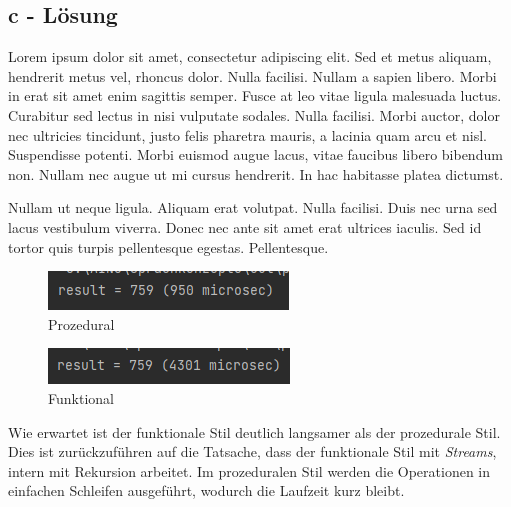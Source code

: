 \subsection*{c - Lösung}
\newline
\begin{code}[language=text, caption={input.txt}, label={lst:Aufgabe4c}]
Lorem ipsum dolor sit amet, consectetur adipiscing elit.
Sed et metus aliquam, hendrerit metus vel, rhoncus dolor.
Nulla facilisi. Nullam a sapien libero.
Morbi in erat sit amet enim sagittis semper.
Fusce at leo vitae ligula malesuada luctus.
Curabitur sed lectus in nisi vulputate sodales. Nulla facilisi.
Morbi auctor, dolor nec ultricies tincidunt, justo felis pharetra mauris, a lacinia quam arcu et nisl.
Suspendisse potenti. Morbi euismod augue lacus, vitae faucibus libero bibendum non.
Nullam nec augue ut mi cursus hendrerit. In hac habitasse platea dictumst.

Nullam ut neque ligula. Aliquam erat volutpat. Nulla facilisi.
Duis nec urna sed lacus vestibulum viverra.
Donec nec ante sit amet erat ultrices iaculis.
Sed id tortor quis turpis pellentesque egestas.
Pellentesque.

\end{code}
\newline
\begin{figure}[h]
	\includegraphics[width=\textwidth]{media/Aufgabe4c_procedural}
	\caption{Prozedural}
	\label{img:Aufgabe4c_procedural}
\end{figure}
\begin{figure}[h]
	\includegraphics[width=\textwidth]{media/Aufgabe4c_functional}
	\caption{Funktional}
	\label{img:Aufgabe4c_functional}
\end{figure}
\newline
Wie erwartet ist der funktionale Stil deutlich langsamer als der prozedurale Stil.
Dies ist zurückzuführen auf die Tatsache, dass der funktionale Stil mit \textit{Streams}, intern mit Rekursion arbeitet.
Im prozeduralen Stil werden die Operationen in einfachen Schleifen ausgeführt, wodurch die Laufzeit kurz bleibt.
\newline
